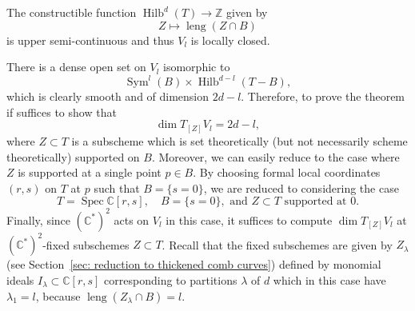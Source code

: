 \documentclass[12pt]{amsart}
\theoremstyle{definition}
\newcommand{\CC} {\mathbb{C}}          %
\newcommand{\ZZ} {\mathbb{Z}}		%
\newcommand{\Sym}{\operatorname{Sym}}
\newcommand{\Hilb}{\operatorname{Hilb}}
\newcommand{\Spec}{\operatorname{Spec}}
\newcommand{\length}{\operatorname{leng}}
\begin{document}
The constructible function $\Hilb^{d}(T)\to \ZZ $ given by
\[
Z\mapsto \length (Z\cap B)
\]
is upper semi-continuous and thus $V_{l}$ is locally closed.

There is a dense open set on $V_{l}$ isomorphic to
\[
\Sym^{l}(B)\times \Hilb^{d-l}(T-B),
\]
which is clearly smooth and of dimension $2d-l$. Therefore, to prove
the theorem if suffices to show that 
\[
\dim T_{[Z]} V_{l} = 2d-l,
\]
where $Z\subset T$ is a subscheme which is set theoretically (but not
necessarily scheme theoretically) supported on $B$. Moreover, we can
easily reduce to the case where $Z$ is supported at a single point
$p\in B$. By choosing formal local coordinates $(r,s)$ on $T$ at $p$
such that $B=\{s=0 \}$, we are reduced to considering the case
\[
T=\Spec \CC [r,s],\quad B=\{s=0 \},\text{ and $Z\subset T$ supported
at $0$.}
\]
Finally, since $\left(\CC^{*} \right)^{2}$ acts on $V_{l}$ in this
case, it suffices to compute $\dim T_{[Z]} V_{l}$ at $\left(\CC^{*}
\right)^{2}$-fixed subschemes $Z\subset T$. Recall that the fixed
subschemes are given by $Z_{\lambda}$ (see Section~\ref{sec: reduction
to thickened comb curves}) defined by monomial ideals
$I_{\lambda}\subset \CC [r,s]$ corresponding to partitions $\lambda$
of $d$ which in this case have $\lambda_{1}=l$, because $\length (Z_{\lambda}\cap B)=l$.
\end{document}
